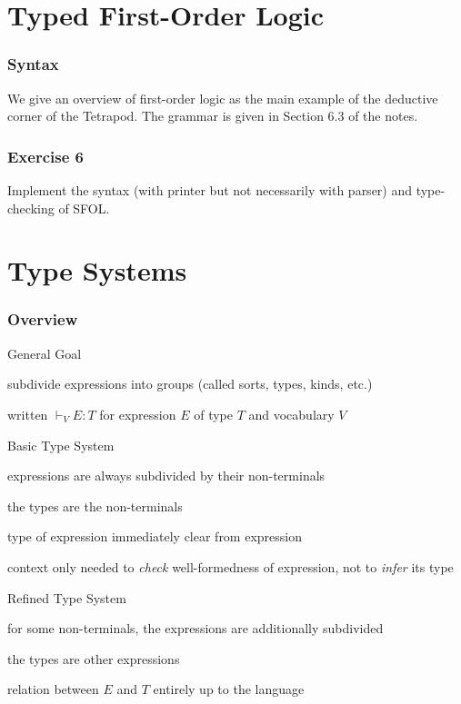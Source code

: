 \section{Typed First-Order Logic}

\begin{frame}\frametitle{Syntax}
We give an overview of first-order logic as the main example of the deductive corner of the Tetrapod.
The grammar is given in Section 6.3 of the notes.
\end{frame}

\begin{frame}\frametitle{Exercise 6}
Implement the syntax (with printer but not necessarily with parser) and type-checking of SFOL.
\end{frame}


\section{Type Systems}

\begin{frame}\frametitle{Overview}
\begin{blockitems}{General Goal}
\item subdivide expressions into groups (called sorts, types, kinds, etc.)
\item written $\vdash_V E:T$ for expression $E$ of type $T$ and vocabulary $V$
\end{blockitems}

\begin{blockitems}{Basic Type System}
\item expressions are always subdivided by their non-terminals
\item the types are the non-terminals
\item type of expression immediately clear from expression
\item context only needed to \emph{check} well-formedness of expression, not to \emph{infer} its type
\end{blockitems}

\begin{blockitems}{Refined Type System}
\item for some non-terminals, the expressions are additionally subdivided
\item the types are other expressions
\item relation between $E$ and $T$ entirely up to the language
\end{blockitems}
\end{frame}

